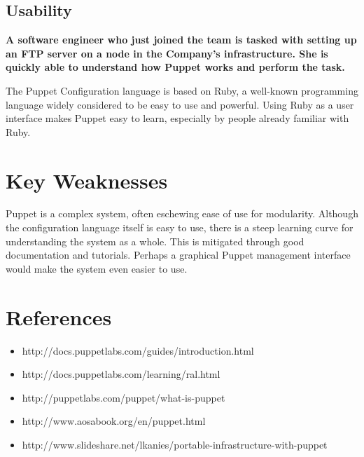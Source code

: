 \documentclass[a4paper]{article}
\begin{document}
\subsection{Usability}

\textbf{A software engineer who just joined the team is tasked with setting up an FTP server on a node in the Company's infrastructure. She is quickly able to understand how Puppet works and perform the task.}

The Puppet Configuration language is based on Ruby, a well-known programming language widely considered to be  easy to use and powerful. Using Ruby as a user interface makes Puppet easy to learn, especially by people already familiar with Ruby.

\section{Key Weaknesses} %


Puppet is a complex system, often eschewing ease of use for modularity. Although the configuration language itself is easy to use, there is a steep learning curve for understanding the system as a whole. This is mitigated through good documentation and tutorials. Perhaps a graphical Puppet management interface would make the system even easier to use.

\section{References} %


\begin{itemize}
\item http://docs.puppetlabs.com/guides/introduction.html
\item http://docs.puppetlabs.com/learning/ral.html
\item http://puppetlabs.com/puppet/what-is-puppet
\item http://www.aosabook.org/en/puppet.html
\item http://www.slideshare.net/lkanies/portable-infrastructure-with-puppet
\end{itemize}
\end{document}
